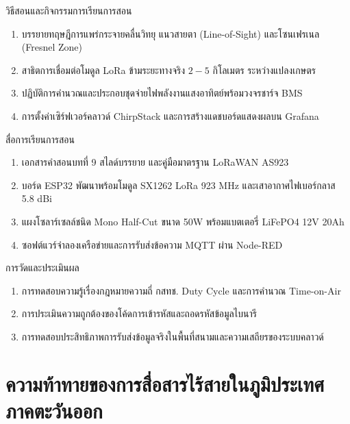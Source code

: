 \begin{planbox}{วิธีสอนและกิจกรรมการเรียนการสอน}
\begin{enumerate}[topsep=2pt, itemsep=1pt, partopsep=0pt, parsep=0pt, leftmargin=1.5em]
    \item บรรยายทฤษฎีการแพร่กระจายคลื่นวิทยุ แนวสายตา (Line-of-Sight) และโซนเฟรเนล (Fresnel Zone)
    \item สาธิตการเชื่อมต่อโมดูล LoRa ข้ามระยะทางจริง $2 - 5\text{ กิโลเมตร}$ ระหว่างแปลงเกษตร
    \item ปฏิบัติการคำนวณและประกอบชุดจ่ายไฟพลังงานแสงอาทิตย์พร้อมวงจรชาร์จ BMS
    \item การตั้งค่าเซิร์ฟเวอร์คลาวด์ ChirpStack และการสร้างแดชบอร์ดแสดงผลบน Grafana
\end{enumerate}
\end{planbox}

\begin{planbox}{สื่อการเรียนการสอน}
\begin{enumerate}[topsep=2pt, itemsep=1pt, partopsep=0pt, parsep=0pt, leftmargin=1.5em]
    \item เอกสารคำสอนบทที่ 9 สไลด์บรรยาย และคู่มือมาตรฐาน LoRaWAN AS923
    \item บอร์ด ESP32 พัฒนาพร้อมโมดูล SX1262 LoRa 923 MHz และเสาอากาศไฟเบอร์กลาส 5.8 dBi
    \item แผงโซลาร์เซลล์ชนิด Mono Half-Cut ขนาด 50W พร้อมแบตเตอรี่ LiFePO4 12V 20Ah
    \item ซอฟต์แวร์จำลองเครือข่ายและการรับส่งข้อความ MQTT ผ่าน Node-RED
\end{enumerate}
\end{planbox}

\begin{planbox}{การวัดและประเมินผล}
\begin{enumerate}[topsep=2pt, itemsep=1pt, partopsep=0pt, parsep=0pt, leftmargin=1.5em]
    \item การทดสอบความรู้เรื่องกฎหมายความถี่ กสทช. Duty Cycle และการคำนวณ Time-on-Air
    \item การประเมินความถูกต้องของโค้ดการเข้ารหัสและถอดรหัสข้อมูลไบนารี
    \item การทดสอบประสิทธิภาพการรับส่งข้อมูลจริงในพื้นที่สนามและความเสถียรของระบบคลาวด์
\end{enumerate}
\end{planbox}

\clearpage

\section{ความท้าทายของการสื่อสารไร้สายในภูมิประเทศภาคตะวันออก}

